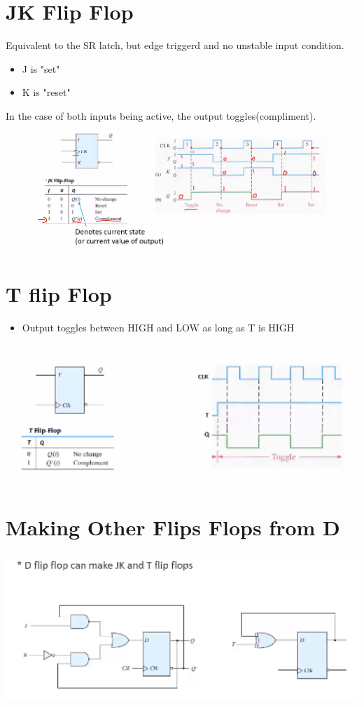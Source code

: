 \documentclass[a4paper,12pt]{article}
\begin{document}
    \section{JK Flip Flop}
        Equivalent to the SR latch, but edge triggerd and no unstable input condition.
        \begin{itemize}
          \item J is "set"
          \item K is "reset"
        \end{itemize}
         In the case of both inputs being active, the output toggles(compliment).\\
         \includegraphics[width=14cm]{JKFlipflopSchem.png}
    \section{T flip Flop}
        \begin{itemize}
          \item Output toggles between HIGH and LOW as long as T is HIGH
        \end{itemize}
        \includegraphics[width=14cm]{TflipFlopSchem.png}
    \section{Making Other Flips Flops from D}
        \includegraphics[width=14cm]{DtoTandJK.png}
\end{document}

